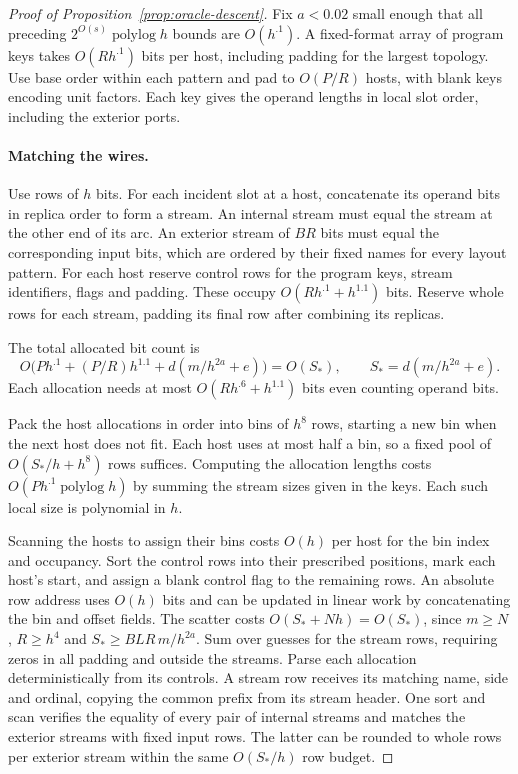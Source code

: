 \begin{proof}[Proof of Proposition~\ref{prop:oracle-descent}]
Fix $a<0.02$ small enough that all preceding
$2^{O(s)}\operatorname{polylog} h$ bounds are $O(h^{.1})$.
A fixed-format array of program keys takes $O(Rh^{.1})$ bits per host,
including padding for the largest topology. Use base order within each
pattern and pad to $O(P/R)$ hosts, with blank keys encoding unit
factors. Each key gives the operand lengths in local slot order,
including the exterior ports.

\paragraph{Matching the wires.}
Use rows of $h$ bits. For each incident slot at a host, concatenate its
operand bits in replica order to form a stream. An internal stream
must equal the stream at the other end of its arc. An exterior stream
of $BR$ bits must equal the corresponding input bits, which are ordered
by their fixed names for every layout pattern. For each host reserve
control rows for the program keys, stream identifiers, flags and
padding. These occupy $O(R h^{.1}+h^{1.1})$ bits. Reserve whole rows
for each stream, padding its final row after combining its replicas.

The total allocated bit count is
\[
 O\big(P h^{.1}+(P/R) h^{1.1}+d(m/h^{2a}+e)\big)
   =O(S_*),\qquad S_*=d(m/h^{2a}+e).
\]
Each allocation needs at most $O(Rh^{.6}+h^{1.1})$ bits even counting operand bits.

Pack the host allocations in order into bins of $h^8$ rows, starting
a new bin when the next host does not fit. Each host uses at most half a
bin, so a fixed pool of $O(S_*/h+h^8)$ rows suffices. Computing the
allocation lengths costs $O(P h^{.1}\operatorname{polylog} h)$ by
summing the stream sizes given in the keys. Each such local size is
polynomial in $h$.

Scanning the hosts to assign their bins costs $O(h)$ per host for the
bin index and occupancy. Sort the control rows into their prescribed
positions, mark each host's start, and assign a blank control flag to
the remaining rows. An absolute row address uses $O(h)$ bits and can
be updated in linear work by concatenating the bin and offset fields.
The scatter costs $O(S_*+Nh)=O(S_*)$, since $m\ge N$, $R\ge h^4$
and $S_*\ge BLR\,m/h^{2a}$. Sum over guesses for
the stream rows, requiring zeros in all padding and outside the
streams. Parse each allocation deterministically from its controls.
A stream row receives its matching name, side and ordinal, copying
the common prefix from its stream header. One sort and scan verifies
the equality of every pair of internal streams and matches the
exterior streams with fixed input rows. The latter can be rounded to
whole rows per exterior stream within the same $O(S_*/h)$ row budget.


\end{proof}
